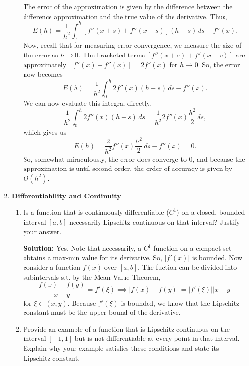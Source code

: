 \documentclass{article}
\theoremstyle{definition}
\theoremstyle{remark}
\begin{document}
\begin{enumerate}
\begin{enumerate}
        The error of the approximation is given by the difference between the difference approximation and the true value of the derivative. Thus,
        \[
            E(h) = \frac{1}{h^{2}} \int_{0}^{h} \left[f''(x+s)+f''(x-s)\right] (h-s) \, ds - f''(x) 
        .\]
        Now, recall that for measuring error convergence, we measure the size of the error as \(h \to 0\). The bracketed terms \(\left[f''(x+s)+f''(x-s)\right]\) are approximately $\left[f''(x)+f''(x)\right] = 2f''(x)$ for \(h\to 0\). So, the error now becomes
        \[
            E(h) = \frac{1}{h^{2}} \int_{0}^{h} 2f''(x) (h-s) \, ds - f''(x) 
        .\]
        We can now evaluate this integral directly.
        \[
            \frac{1}{h^{2}} \int_{0}^{h} 2f''(x) (h-s) \, ds = \frac{1}{h^{2}} 2f''(x) \frac{h^{2}}{2} \, ds
        ,\]
        which gives us
        \[
            E(h) = \frac{2}{h^{2}}f''(x) \frac{h^{2}}{2} \, ds - f''(x) = 0
        .\]
        So, somewhat miraculously, the error does converge to 0, and because the approximation is until second order, the order of accuracy is given by \(O(h^{2})\).
        
        
    \end{enumerate}
    
    \item \textbf{Differentiability and Continuity}
    \begin{enumerate}
        \item  Is a function that is continuously differentiable (\(C^{1}\)) on a closed, bounded interval $[a,b]$ necessarily Lipschitz continuous on that interval? Justify your answer.

        \textbf{Solution:} Yes. Note that necessarily, a \(C^{1}\) function on a compact set obtains a max-min value for its derivative. So, \(|f'(x)|\) is bounded. Now consider a function \(f(x)\) over \([a,b]\). The fuction can be divided into subintervals s.t. by the Mean Value Theorem,
        \[
            \frac{f(x)-f(y)}{x-y} = f'(\xi) \implies |f(x)-f(y)| = |f'(\xi)||x-y|
        \]
        for \(\xi\in(x,y)\). Because \(f'(\xi)\) is bounded, we know that the Lipschitz constant must be the upper bound of the derivative.\\

        \item  Provide an example of a function that is Lipschitz continuous on the interval $[-1,1]$ but is not differentiable at every point in that interval. Explain why your example satisfies these conditions and state its Lipschitz constant.


\end{enumerate}
\end{enumerate}
\end{document}
